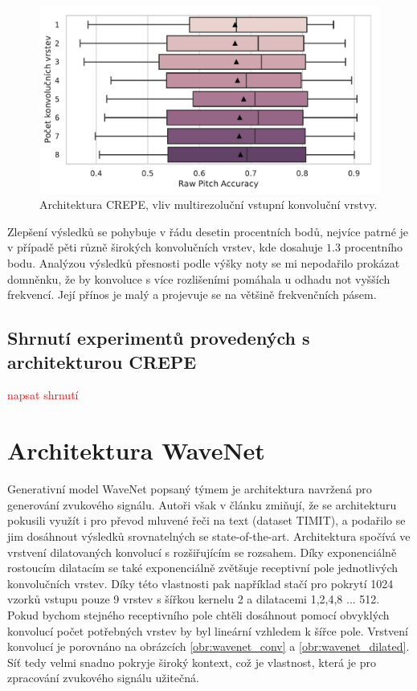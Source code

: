 \begin{figure}[h!]\centering
    \includegraphics[scale=0.6]{../img/figures/crepe_multirozliseni.pdf}
\caption{Architektura CREPE, vliv multirezoluční vstupní konvoluční vrstvy.}\label{obr:crepe_multirozliseni}
\end{figure}

Zlepšení výsledků se pohybuje v řádu desetin procentních bodů, nejvíce patrné je v případě pěti různě širokých konvolučních vrstev, kde dosahuje $1.3$ procentního bodu. Analýzou výsledků přesnosti podle výšky noty se mi nepodařilo prokázat domněnku, že by konvoluce s více rozlišeními pomáhala u odhadu not vyšších frekvencí. Její přínos je malý a projevuje se na většině frekvenčních pásem.

\subsection{Shrnutí experimentů provedených s architekturou CREPE}

\textcolor{red}{napsat shrnutí}

\section{Architektura WaveNet}

Generativní model WaveNet popsaný týmem \cite{Oord2016} je architektura navržená pro generování zvukového signálu. Autoři však v článku zmiňují, že se architekturu pokusili využít i pro převod mluvené řeči na text (dataset TIMIT), a podařilo se jim dosáhnout výsledků srovnatelných se state-of-the-art. Architektura spočívá ve vrstvení dilatovaných konvolucí s rozšiřujícím se rozsahem. Díky exponenciálně rostoucím dilatacím se také exponenciálně zvětšuje receptivní pole jednotlivých konvolučních vrstev. Díky této vlastnosti pak například stačí pro pokrytí 1024 vzorků vstupu pouze 9 vrstev s šířkou kernelu 2 a dilatacemi 1,2,4,8 ... 512. Pokud bychom stejného receptivního pole chtěli dosáhnout pomocí obvyklých konvolucí počet potřebných vrstev by byl lineární vzhledem k šířce pole. Vrstvení konvolucí je porovnáno na obrázcích \ref{obr:wavenet_conv} a \ref{obr:wavenet_dilated}. Síť tedy velmi snadno pokryje široký kontext, což je vlastnost, která je pro zpracování zvukového signálu užitečná.

